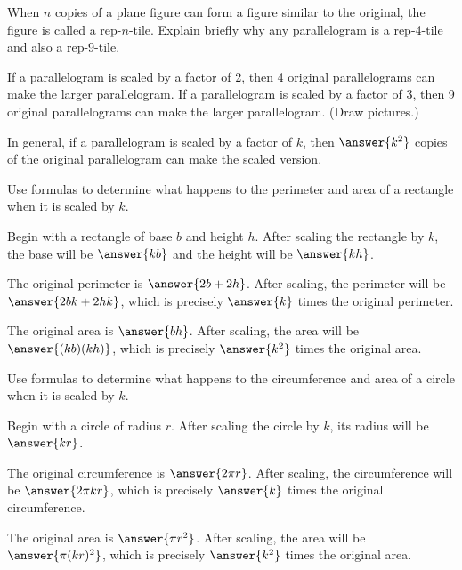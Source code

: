 \documentclass[nooutcomes]{ximera}
\begin{document}
\begin{question}
When $n$ copies of a plane figure can form a figure similar to the original, the figure is called a rep-$n$-tile.  Explain briefly why any parallelogram is a rep-4-tile and also a rep-9-tile.  
\begin{freeResponse}
\begin{hint}
If a parallelogram is scaled by a factor of 2, then 4 original parallelograms can make the larger parallelogram.  If a parallelogram is scaled by a factor of 3, then 9 original parallelograms can make the larger parallelogram.  (Draw pictures.)
\end{hint}
\end{freeResponse}

In general, if a parallelogram is scaled by a factor of $k$, then $\answer{k^2}$ copies of the original parallelogram can make the scaled version.  
\end{question}

\begin{question}
Use formulas to determine what happens to the perimeter and area of a rectangle when it is scaled by $k$.  

Begin with a rectangle of base $b$ and height $h$.  After scaling the rectangle by $k$, the base will be $\answer{kb}$ and the height will be $\answer{kh}$.  

The original perimeter is $\answer{2b + 2h}$.  After scaling, the perimeter will be $\answer{2bk + 2hk}$, which is precisely $\answer{k}$ times the original perimeter.  

The original area is $\answer{bh}$.  After scaling, the area will be $\answer{(kb)(kh)}$, which is precisely $\answer{k^2}$ times the original area.  
\end{question}


\begin{question}
Use formulas to determine what happens to the circumference and area of a circle when it is scaled by $k$.  

Begin with a circle of radius $r$.  After scaling the circle by $k$, its radius will be $\answer{kr}$.  

The original circumference is $\answer{2\pi r}$.  After scaling, the circumference will be $\answer{2\pi kr}$, which is precisely $\answer{k}$ times the original circumference.  

The original area is $\answer{\pi r^2}$.  After scaling, the area will be $\answer{\pi (kr)^2}$, which is precisely $\answer{k^2}$ times the original area.  
\end{question}
\end{document}
